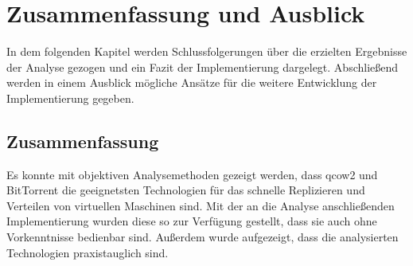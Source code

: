 \chapter{Zusammenfassung und Ausblick} 
In dem folgenden Kapitel werden Schlussfolgerungen über die erzielten Ergebnisse der Analyse gezogen und ein Fazit der Implementierung dargelegt. Abschließend werden in einem Ausblick mögliche Ansätze für die weitere Entwicklung der Implementierung gegeben.

\section{Zusammenfassung}
Es konnte mit objektiven Analysemethoden gezeigt werden, dass qcow2 und BitTorrent die geeignetsten Technologien für das schnelle Replizieren und Verteilen von virtuellen Maschinen sind. Mit der an die Analyse anschließenden Implementierung wurden diese so zur Verfügung gestellt, dass sie auch ohne Vorkenntnisse bedienbar sind. Außerdem wurde aufgezeigt, dass die analysierten Technologien praxistauglich sind.

